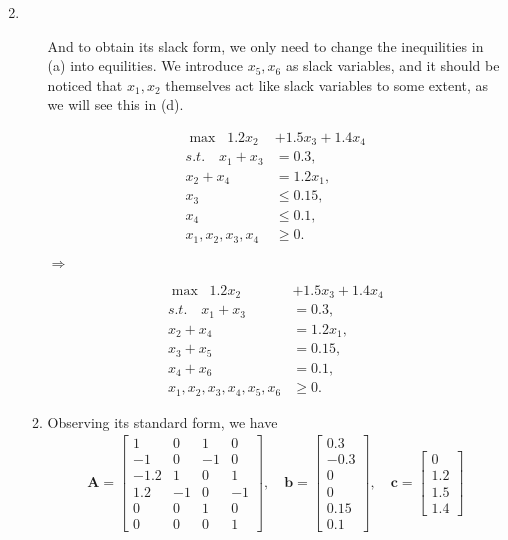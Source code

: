 \documentclass[12pt,a4paper]{article}
\makeatletter
\newtheorem*{solution}{Solution}
\theoremstyle{definition}
\renewenvironment{solution}[1][Solution] {\par\pushQED{\qed}\normalfont\topsep6\p@\@plus6\p@\relax\trivlist\item[\hskip\labelsep\bfseries#1\@addpunct{.}]\ignorespaces}{\popQED\endtrivlist\@endpefalse} \makeatother
\makeatother
\begin{document}
\begin{enumerate}
\begin{solution}
\begin{enumerate}
			And to obtain its slack form, we only need to change the inequilities in (a) into equilities. We introduce $x_5,x_6$ as slack variables, and it should be noticed that $x_1,x_2$ themselves act like slack variables to some extent, as we will see this in (d).\newline
			\begin{minipage}{0.45\textwidth}
				\begin{align*}
				\max\;\; 1.2x_2&+1.5x_3+1.4x_4\\
				s.t. \quad x_1+x_3&=0.3,\\
				x_2+x_4&=1.2x_1,\\
				x_3&\leq0.15,\\
				x_4&\leq0.1,\\
				x_1,x_2,x_3,x_4&\geq0.
				\end{align*} 
			\end{minipage}
		$\Rightarrow$
			\begin{minipage}{0.45\textwidth}
				\begin{align*}
				\max\;\; 1.2x_2&+1.5x_3+1.4x_4\\
				s.t. \quad x_1+x_3&=0.3,\\
				x_2+x_4&=1.2x_1,\\
				x_3+x_5&=0.15,\\
				x_4+x_6&=0.1,\\
				x_1,x_2,x_3,x_4,x_5,x_6&\geq0.
				\end{align*} 
			\end{minipage}
		\item Observing its standard form, we have 
		\begin{align*}
			\mathbf{A}=\begin{bmatrix}
			1 & 0 &1 &0 \\
			-1 &0 &-1 &0\\
			-1.2 &1 &0&1\\
			1.2&-1&0&-1\\
			0&0&1&0\\
			0&0&0&1
			\end{bmatrix},\quad
			\mathbf{b}=\begin{bmatrix}
			0.3\\-0.3\\0\\0\\0.15\\0.1
			\end{bmatrix},\quad
		\mathbf{c}=\begin{bmatrix}
		0\\1.2\\1.5\\1.4

\end{bmatrix}
\end{align*}
\end{enumerate}
\end{solution}
\end{enumerate}
\end{document}
